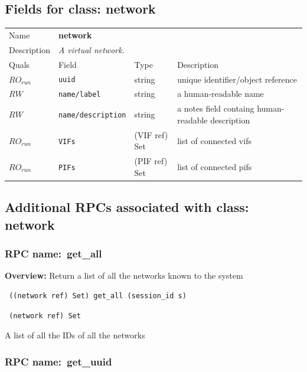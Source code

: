 \subsection{Fields for class: network}
\begin{longtable}{|lllp{}|}
\hline
\multicolumn{1}{|l}{Name} & \multicolumn{3}{l|}{\bf network} \\
\multicolumn{1}{|l}{Description} & \multicolumn{3}{l|}{\parbox{11cm}{\em A
virtual network.}} \\
\hline
Quals & Field & Type & Description \\
\hline
$\mathit{RO}_\mathit{run}$ &  {\tt uuid} & string & unique identifier/object reference \\
$\mathit{RW}$ &  {\tt name/label} & string & a human-readable name \\
$\mathit{RW}$ &  {\tt name/description} & string & a notes field containg human-readable description \\
$\mathit{RO}_\mathit{run}$ &  {\tt VIFs} & (VIF ref) Set & list of connected vifs \\
$\mathit{RO}_\mathit{run}$ &  {\tt PIFs} & (PIF ref) Set & list of connected pifs \\
\hline
\end{longtable}
\subsection{Additional RPCs associated with class: network}
\subsubsection{RPC name:~get\_all}

{\bf Overview:} 
Return a list of all the networks known to the system

\begin{verbatim} ((network ref) Set) get_all (session_id s)\end{verbatim}


\vspace{0.3cm}

{\tt 
(network ref) Set
}


A list of all the IDs of all the networks
\vspace{0.3cm}
\vspace{0.3cm}
\vspace{0.3cm}
\subsubsection{RPC name:~get\_uuid}

